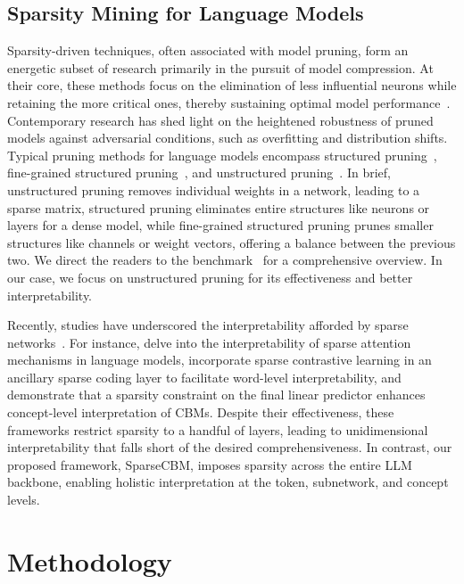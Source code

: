 \documentclass[letterpaper]{article} %
\begin{document}
\subsection{Sparsity Mining for Language Models}
Sparsity-driven techniques, often associated with model pruning, form an energetic subset of research primarily in the pursuit of model compression. At their core, these methods focus on the elimination of less influential neurons while retaining the more critical ones, thereby sustaining optimal model performance~\citep{lecun1990optimal,han2015deep,magnitude,hessian,liu2017learning,he2017channel,zhou2016less}. Contemporary research has shed light on the heightened robustness of pruned models against adversarial conditions, such as overfitting and distribution shifts.
Typical pruning methods for language models encompass structured pruning~\citep{michel2019sixteen}, fine-grained structured pruning~\citep{lagunas2021block}, and unstructured pruning~\citep{gale2019state}. In brief, unstructured pruning removes individual weights in a network, leading to a sparse matrix, structured pruning eliminates entire structures like neurons or layers for a dense model, while fine-grained structured pruning prunes smaller structures like channels or weight vectors, offering a balance between the previous two. We direct the readers to the benchmark~\cite{liu2023sparsity} for a comprehensive overview. In our case, we focus on unstructured pruning for its effectiveness and better interpretability.

Recently, studies have underscored the interpretability afforded by sparse networks~\citep{subramanian2018spine}. For instance, \citet{meister2021sparse} delve into the interpretability of sparse attention mechanisms in language models, \citet{liu2022improve} incorporate sparse contrastive learning in an ancillary sparse coding layer to facilitate word-level interpretability, and \citet{oikarinenlabel} demonstrate that a sparsity constraint on the final linear predictor enhances concept-level interpretation of CBMs. Despite their effectiveness, these frameworks restrict sparsity to a handful of layers, leading to unidimensional interpretability that falls short of the desired comprehensiveness. In contrast, our proposed framework, SparseCBM, imposes sparsity across the entire LLM backbone, enabling holistic interpretation at the token, subnetwork, and concept levels.

\section{Methodology}
\end{document}
